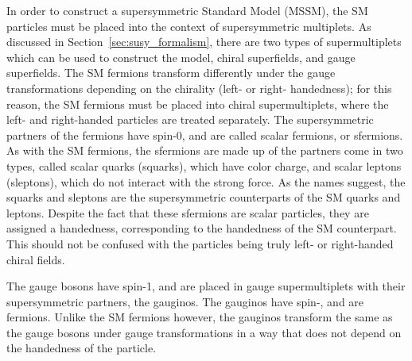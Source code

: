In order to construct a supersymmetric Standard Model (MSSM), the SM particles
must be placed into the context of supersymmetric multiplets.
As discussed in Section~\ref{sec:susy_formalism}, there are two types of
supermultiplets which can be used to construct the model, chiral superfields,
and gauge superfields.
The SM fermions transform differently under the gauge transformations depending
on the chirality (left- or right- handedness); for this reason, the SM fermions
must be placed into chiral supermultiplets, where the left- and right-handed
particles are treated separately.
The supersymmetric partners of the fermions have spin-0, and are called
scalar fermions, or sfermions.
As with the SM fermions, the sfermions are made up of the partners come in
two types, called scalar quarks (squarks), which have color charge, and scalar
leptons (sleptons), which do not interact with the strong force.
As the names suggest, the squarks and sleptons are the supersymmetric
counterparts of the SM quarks and leptons.
Despite the fact that these sfermions are scalar particles, they are assigned
a handedness, corresponding to the handedness of the SM counterpart.
This should not be confused with the particles being truly left- or
right-handed chiral fields.

The gauge bosons have spin-1, and are placed in gauge supermultiplets with
their supersymmetric partners, the gauginos.
The gauginos have spin-, and are fermions.
Unlike the SM fermions however, the gauginos transform the same as the gauge
bosons under gauge transformations in a way that does not depend on the
handedness of the particle.

